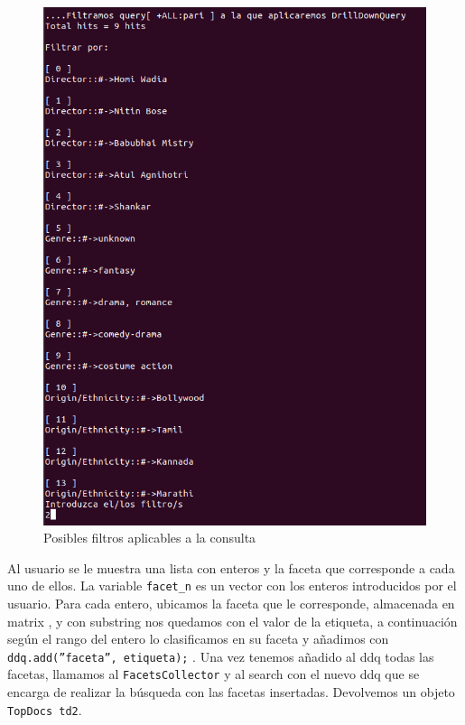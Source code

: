 \begin{figure}[H]
	\centering
	\includegraphics[scale=0.5]{images/ddq-facetas.png}
	\caption{Posibles filtros aplicables a la consulta}
\end{figure}
	
	
Al usuario se le muestra una lista con enteros y la faceta que corresponde a cada uno de ellos. La variable \texttt{facet\_n} es un vector con los enteros introducidos por el usuario. Para cada entero, ubicamos la faceta que le corresponde, almacenada en matrix , y con substring nos quedamos con el valor de la etiqueta, a continuación según el rango del entero lo clasificamos en su faceta y añadimos con \texttt{ddq.add(''faceta'', etiqueta);} . Una vez tenemos añadido al ddq todas las facetas, llamamos al \texttt{FacetsCollector} y al search con el nuevo ddq que se encarga de realizar la búsqueda con las facetas insertadas. Devolvemos un objeto \texttt{TopDocs td2}.

